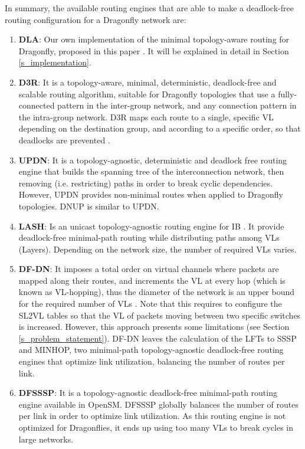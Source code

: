 \documentclass[review]{elsarticle}
\newcommand{\dflys}{Dragonflies}
\newcommand{\dfly}{Dragonfly}
\newcommand{\ib}{IB}
\begin{document}
In summary, the available routing engines that are able to make a deadlock-free routing configuration for a \dfly{} network are:
\begin{enumerate}
    \item {\bf DLA}: Our own implementation of the minimal topology-aware routing for \dfly{}, proposed in this paper \cite{kim_technology-driven_2008}.
     It will be explained in detail in Section \ref{s_implementation}.

    \item {\bf D3R}: It is a topology-aware, minimal, deterministic, deadlock-free and scalable routing algorithm, suitable for
    \dfly{} topologies that use a fully-connected pattern in the inter-group network, and any connection pattern in the intra-group network.
    D3R maps each route to a single, specific VL depending on the destination group, and according to a specific order, so that deadlocks are prevented \cite{maglione2018_d3r}.

   \item {\bf UPDN}:  It is a topology-agnostic, deterministic and deadlock free routing engine \cite{sancho2001_updn} that
   builds the spanning tree of the interconnection network, then removing (i.e. restricting) paths in order to break cyclic dependencies.  
   However, UPDN provides non-minimal routes when applied to \dfly{} topologies.
   DNUP is similar to UPDN.
		
   \item {\bf LASH}: Is an unicast topology-agnostic routing engine for \ib{}  \cite{skeie2002_lash}.
   It provide deadlock-free minimal-path routing while distributing paths among VLs (Layers).
   Depending on the network size, the number of required VLs varies.

   \item {\bf DF-DN}: It imposes a total order on virtual channels where packets are mapped along their routes, and increments the VL at every hop (which is known as VL-hopping), thus the diameter of the network
   is an upper bound for the required number of VLs \cite{schneider2016_dfdn}.
   Note that this requires to configure the SL2VL tables so that the VL of packets moving between two specific switches is increased.
   However, this approach presents some limitations (see Section \ref{s_problem_statement}).
   DF-DN leaves the calculation of the LFTs to SSSP and MINHOP, two minimal-path topology-agnostic deadlock-free routing engines that optimize link utilization, balancing the number of routes per link.
   
   \item {\bf DFSSSP}: It is a topology-agnostic deadlock-free minimal-path routing engine \cite{domke2011_dfsssp} available in OpenSM.
   DFSSSP globally balances the number of routes per link in order to optimize link utilization.
   As this routing engine is not optimized for \dflys{}, it ends up using too many VLs to break cycles in large networks.
\end{enumerate}
\end{document}
